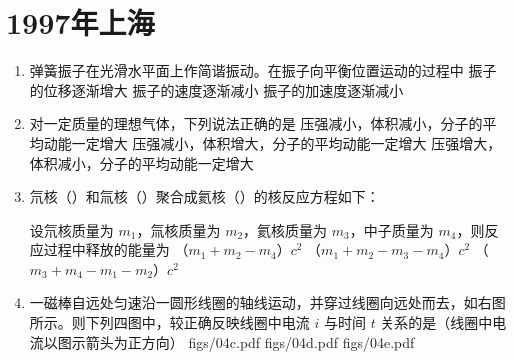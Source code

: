 \documentclass[\gkver]{gaokaozhenti}
\begin{document}
\chapter{1997年上海}

\begin{enumerate}
\item
弹簧振子在光滑水平面上作简谐振动。在振子向平衡位置运动的过程中
{振子的位移逐渐增大}
{振子的速度逐渐减小}
{振子的加速度逐渐减小}


\item
对一定质量的理想气体，下列说法正确的是
{压强减小，体积减小，分子的平均动能一定增大}
{压强减小，体积增大，分子的平均动能一定增大}
{压强增大，体积减小，分子的平均动能一定增大}


\item
氘核（）和氚核（）聚合成氦核（）的核反应方程如下：


设氘核质量为 $m_{1}$，氚核质量为 $m_{2}$，氦核质量为 $m_{3}$，中子质量为 $m_{4}$，则反应过程中释放的能量为
{（$m_{1} + m_{2} - m_{4}$）$c^{2}$}
{（$m_{1} + m_{2} - m_{3} - m_{4}$）$c^{2}$}
{（$m_{3} + m_{4} - m_{1} - m_{2}$）$c^{2}$}


\item
一磁棒自远处匀速沿一圆形线圈的轴线运动，并穿过线圈向远处而去，如右图所示。则下列四图中，较正确反映线圈中电流 $i$ 与时间 $t$ 关系的是（线圈中电流以图示箭头为正方向）
\onepicture[w=5cm]{}
{figs/04c.pdf}
{figs/04d.pdf}
{figs/04e.pdf}


\end{enumerate}
\end{document}
